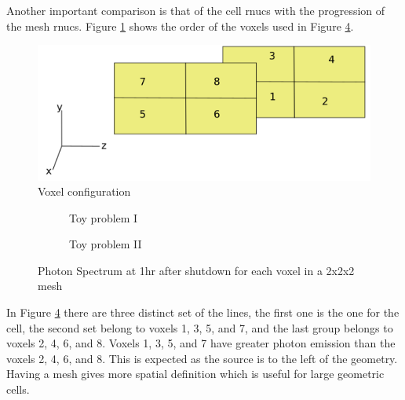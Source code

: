 Another important comparison is that of the cell rnucs with the progression of the mesh rnucs. 
Figure \ref{voxels} shows the order of the voxels used in Figure \ref{spect_cell_2x_byV}. 


\begin{figure}[h]
\begin{centering}
\includegraphics[width=0.60\linewidth]{../figs/voxels.png}
\caption{Voxel configuration}
\label{voxels}
\end{centering}
\end{figure}

\begin{figure}[h]
 \begin{centering}
 \centering
 \begin{subfigure}[b]{.45\textwidth}
 \caption{Toy problem I }
 \label{1spect_cell_2x_byV}
 \end{subfigure}
 \hspace{0.05cm}
 \begin{subfigure}[b]{.45\textwidth}
 \centering
 \caption{Toy problem II}
 \label{2spect_cell_2x_byV}
 \end{subfigure}
 \caption{Photon Spectrum at 1hr after shutdown for each voxel in a 2x2x2 mesh}
 \label{spect_cell_2x_byV}
 \end{centering}
\end{figure}

In Figure \ref{spect_cell_2x_byV} there are three distinct set of the lines, the 
first one is the one for the cell, the second set belong to voxels 1, 3, 5, and 7, and the 
last group belongs to voxels 2, 4, 6, and 8. Voxels 1, 3, 5, and 7 have greater photon emission 
than the voxels 2, 4, 6, and 8. This is expected as the source is to the left of the geometry. 
Having a mesh gives more spatial definition which is useful for large geometric cells. 
